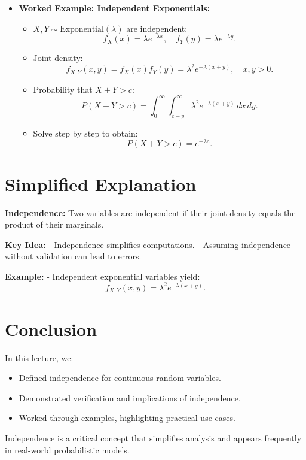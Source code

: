 \documentclass{article}
\begin{document}
\begin{itemize}
  \item \textbf{Worked Example: Independent Exponentials:}
    \begin{itemize}
      \item $X, Y \sim \text{Exponential}(\lambda)$ are independent:
        \[
          f_X(x) = \lambda e^{-\lambda x}, \quad f_Y(y) = \lambda e^{-\lambda y}.
        \]
      \item Joint density:
        \[
          f_{X,Y}(x,y) = f_X(x) f_Y(y) = \lambda^2 e^{-\lambda(x+y)}, \quad x, y > 0.
        \]
      \item Probability that $X+Y > c$:
        \[
          P(X+Y > c) = \int_0^\infty \int_{c-y}^\infty \lambda^2 e^{-\lambda(x+y)} \, dx \, dy.
        \]
      \item Solve step by step to obtain:
        \[
          P(X+Y > c) = e^{-\lambda c}.
        \]
    \end{itemize}
\end{itemize}

\section*{Simplified Explanation}

\textbf{Independence:}
Two variables are independent if their joint density equals the product of their marginals.

\textbf{Key Idea:}
- Independence simplifies computations.
- Assuming independence without validation can lead to errors.

\textbf{Example:}
- Independent exponential variables yield:
\[
  f_{X,Y}(x,y) = \lambda^2 e^{-\lambda(x+y)}.
\]

\section*{Conclusion}

In this lecture, we:
\begin{itemize}
  \item Defined independence for continuous random variables.
  \item Demonstrated verification and implications of independence.
  \item Worked through examples, highlighting practical use cases.
\end{itemize}

Independence is a critical concept that simplifies analysis and appears frequently in real-world probabilistic models.
\end{document}
